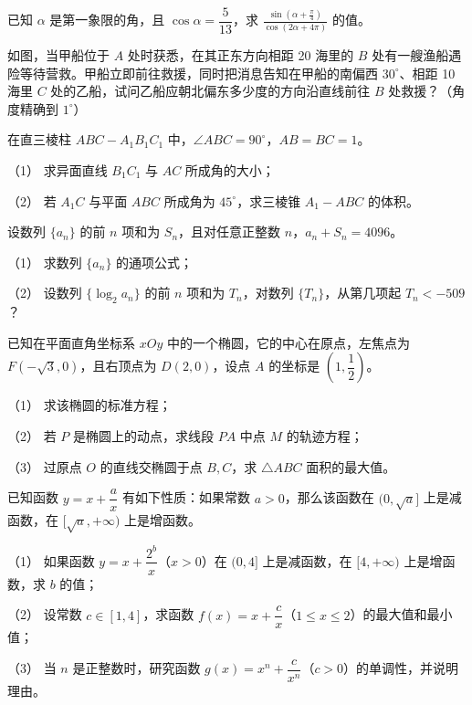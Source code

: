 \begin{question}
已知 $\alpha$ 是第一象限的角，且 $\cos\alpha=\dfrac5{13}$，求 $\displaystyle\frac{\sin\left(\alpha+\frac\pi4\right)}{\cos(2\alpha+4\pi)}$ 的值。

\Needspace{0.4\textheight}
\end{question}
\begin{question}
如图，当甲船位于 $A$ 处时获悉，在其正东方向相距 20 海里的 $B$ 处有一艘渔船遇险等待营救。甲船立即前往救援，同时把消息告知在甲船的南偏西 $30^\circ$、相距 10 海里 $C$ 处的乙船，试问乙船应朝北偏东多少度的方向沿直线前往 $B$ 处救援？（角度精确到 $1^\circ$）
\nopagebreak[4]
\begin{center}\end{center}
\nopagebreak[4]
\Needspace{0.4\textheight}
\end{question}
\begin{question}
在直三棱柱 $ABC-A_1B_1C_1$ 中，$\angle ABC=90^\circ$，$AB=BC=1$。

（1） 求异面直线 $B_1C_1$ 与 $AC$ 所成角的大小；

（2） 若 $A_1C$ 与平面 $ABC$ 所成角为 $45^\circ$，求三棱锥 $A_1-ABC$ 的体积。
\nopagebreak[4]
\begin{center}\end{center}
\nopagebreak[4]
\end{question}
\begin{question}
设数列 $\{a_n\}$ 的前 $n$ 项和为 $S_n$，且对任意正整数 $n$，$a_n+S_n=4096$。

（1） 求数列 $\{a_n\}$ 的通项公式；

（2） 设数列 $\{\log_2a_n\}$ 的前 $n$ 项和为 $T_n$，对数列 $\{T_n\}$，从第几项起 $T_n<-509$？

\end{question}
\begin{question}
已知在平面直角坐标系 $xOy$ 中的一个椭圆，它的中心在原点，左焦点为 $F(-\sqrt3,0)$，且右顶点为 $D(2,0)$，设点 $A$ 的坐标是 $\left(1,\dfrac12\right)$。

（1） 求该椭圆的标准方程；

（2） 若 $P$ 是椭圆上的动点，求线段 $PA$ 中点 $M$ 的轨迹方程；

（3） 过原点 $O$ 的直线交椭圆于点 $B,C$，求 $\triangle ABC$ 面积的最大值。

\end{question}
\begin{question}
已知函数 $y=x+\dfrac ax$ 有如下性质：如果常数 $a>0$，那么该函数在 $(0,\sqrt a]$ 上是减函数，在 $[\sqrt a,+\infty)$ 上是增函数。

（1） 如果函数 $y=x+\dfrac{2^b}{x}$（$x>0$）在 $(0,4]$ 上是减函数，在 $[4,+\infty)$ 上是增函数，求 $b$ 的值；

（2） 设常数 $c\in[1,4]$，求函数 $f(x)=x+\dfrac cx$（$1\leqslant x\leqslant2$）的最大值和最小值；

（3） 当 $n$ 是正整数时，研究函数 $g(x)=x^n+\dfrac c{x^n}$（$c>0$）的单调性，并说明理由。

\end{question}